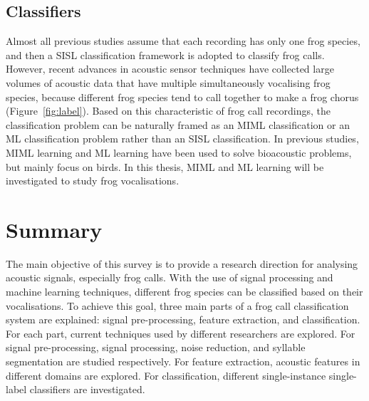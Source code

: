 \subsection{Classifiers}
Almost all previous studies assume that each recording has only one frog species, and then a SISL classification framework is adopted to classify frog calls. However, recent advances in acoustic sensor techniques have collected large volumes of acoustic data that have multiple simultaneously vocalising frog species, because different frog species tend to call together to make a frog chorus (Figure~\ref{fig:label}). Based on this characteristic of frog call recordings, the classification problem can be naturally framed as an MIML classification or an ML classification problem rather than an SISL classification.
In previous studies, MIML learning and ML learning have been used to solve bioacoustic problems, but mainly focus on birds. In this thesis, MIML and ML learning will be investigated to study frog vocalisations.





\section{Summary}
\label{conclusion}
The main objective of this survey is to provide a research direction for analysing acoustic signals, especially frog calls. With the use of signal processing and machine learning techniques, different frog species can be classified based on their vocalisations. To achieve this goal, three main parts of a frog call classification system are explained: signal pre-processing, feature extraction, and classification. For each part, current techniques used by different researchers are explored. For signal pre-processing, signal processing, noise reduction, and syllable segmentation are studied respectively. For feature extraction, acoustic features in different domains are explored. For classification, different single-instance single-label classifiers are investigated. 

